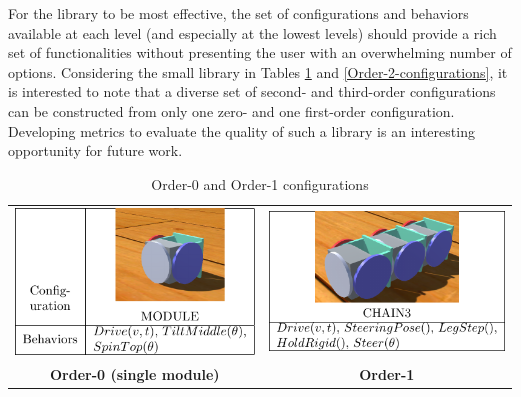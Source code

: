 \documentclass[graybox]{svmult}
\begin{document}
For the library to be most effective, the set of configurations and behaviors available
 at each level (and especially at the lowest levels) should provide a rich set of
 functionalities without presenting the user with an overwhelming number of options. 
 Considering the small library in Tables \ref{Order-1-configurations} and \ref{Order-2-configurations},
 it is interested to note that a diverse set of second- and third-order configurations can
be constructed from only one zero- and one first-order configuration. Developing metrics to
evaluate the quality of such a library is an interesting opportunity for future work. 

\begin{table}
     \begin{center}
        \begin{tabular}{c c}
         \includegraphics[scale=1]{images/library/tier0.pdf} &
         \includegraphics[scale=1]{images/library/tier1.pdf} \\
         \textbf{Order-0 (single module)} & \textbf{Order-1}
        \end{tabular}
         \caption{Order-0 and Order-1 configurations}
         \label{Order-1-configurations}
     \end{center}
\end{table}
\end{document}
